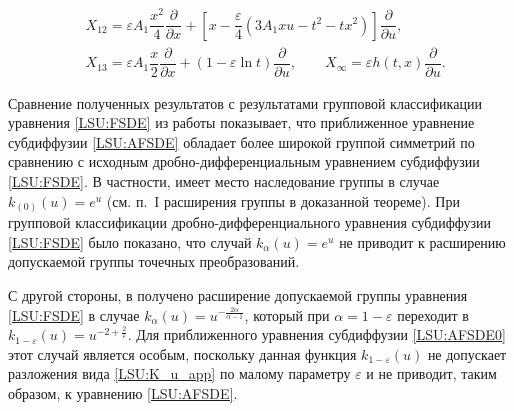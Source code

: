 \begin{theorem}
\begin{eqnarray*}
& X_{12}=\varepsilon A_1 \dfrac{x^2}{4} \dfrac{\partial}{\partial x}+\left[x-\dfrac{\varepsilon}{4}(3 A_1 x u- t^2 -tx^2) \right] \dfrac{\partial}{\partial u},  \\

& X_{13}=\varepsilon A_1 \dfrac{x}{2} \dfrac{\partial}{\partial x}+(1-\varepsilon \ln t)\dfrac{\partial}{\partial u}, \qquad 

X_{\infty}=\varepsilon h(t,x) \dfrac{\partial}{\partial u}.

\end{eqnarray*}\vspace{-4mm}


\end{theorem}



Сравнение полученных результатов с результатами групповой классификации уравнения \eqref{LSU:FSDE} из работы \cite{LSU:GKL_PS_09} показывает, что приближенное уравнение субдиффузии \eqref{LSU:AFSDE} обладает более широкой группой симметрий по сравнению с исходным дробно-дифференциальным уравнением субдиффузии \eqref{LSU:FSDE}. В частности, имеет место наследование группы в случае $k_{(0)}(u)=e^u$ (см. п.~I расширения группы в доказанной теореме). При групповой классификации дробно-дифференциального уравнения субдиффузии \eqref{LSU:FSDE} было показано, что случай $k_{\alpha}(u)=e^u$ не приводит к расширению допускаемой группы точечных преобразований. 



С другой стороны, в \cite{LSU:GKL_PS_09} получено расширение допускаемой группы уравнения \eqref{LSU:FSDE} в случае $k_{\alpha}(u)=u^{-\frac{2\alpha}{\alpha-1}}$, который при $\alpha=1-\varepsilon$ переходит в $k_{1-\varepsilon}(u)=u^{-2+\frac{2}{\varepsilon}}$. Для приближенного уравнения субдиффузии \eqref{LSU:AFSDE0} этот случай является особым, поскольку данная функция $k_{1-\varepsilon}(u)$ не допускает разложения вида \eqref{LSU:K_u_app} по малому параметру $\varepsilon$ и не приводит, таким образом, к уравнению \eqref{LSU:AFSDE}.






